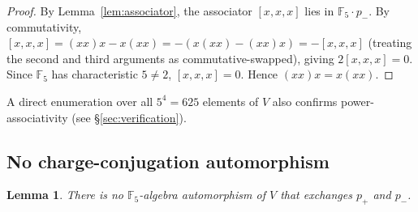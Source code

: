 \documentclass[11pt,reqno]{amsart}
\theoremstyle{plain}
\newtheorem{lemma}[theorem]{Lemma}
\theoremstyle{definition}
\theoremstyle{remark}
\newcommand{\F}{\mathbb{F}}
\begin{document}
\begin{proof}
By Lemma~\ref{lem:associator}, the associator $[x, x, x]$ lies in $\F_5 \cdot p_-$. By commutativity, $[x, x, x] = (xx)x - x(xx) = -(x(xx) - (xx)x) = -[x, x, x]$ (treating the second and third arguments as commutative-swapped), giving $2 [x, x, x] = 0$. Since $\F_5$ has characteristic $5 \neq 2$, $[x, x, x] = 0$. Hence $(xx)x = x(xx)$.
\end{proof}

A direct enumeration over all $5^4 = 625$ elements of $V$ also confirms power-associativity (see §\ref{sec:verification}).

\subsection{No charge-conjugation automorphism}

\begin{lemma} \label{lem:no-cc}
There is no $\F_5$-algebra automorphism of $V$ that exchanges $p_+$ and $p_-$.
\end{lemma}
\end{document}
